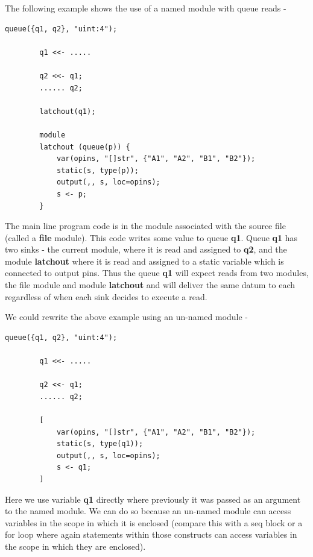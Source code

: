 \documentclass[10pt,a4paper,twoside,fleqn]{article}
\newcommand{\kwd}[1]{{\bf #1}} %
\newcommand{\var}[1]{{\bf #1}} %
\begin{document}
    The following example shows the use of a named module with queue reads -
    \begin{lstlisting}[language=threepl]
        queue({q1, q2}, "uint:4");
        
        q1 <<- .....

        q2 <<- q1;
        ...... q2;

        latchout(q1);

        module
        latchout (queue(p)) {
            var(opins, "[]str", {"A1", "A2", "B1", "B2"});
            static(s, type(p));
            output(,, s, loc=opins);
            s <- p;
        }
    \end{lstlisting}
    The main line program code is in the module associated with the source file
    (called a \kwd{file} module).
    This code writes some value to queue \var{q1}. Queue \var{q1} has two
    sinks - the current module, where it is read and assigned to \var{q2},
    and the module \var{latchout} where it is read and assigned to a static
    variable which is connected to output pins. Thus the queue \var{q1} will
    expect reads from two modules, the file module and module \var{latchout}
    and will deliver the same datum to each regardless of when each sink
    decides to execute a read.
    
    We could rewrite the above example using an un-named module -
    \begin{lstlisting}[language=threepl]
        queue({q1, q2}, "uint:4");
        
        q1 <<- .....

        q2 <<- q1;
        ...... q2;

        [
            var(opins, "[]str", {"A1", "A2", "B1", "B2"});
            static(s, type(q1));
            output(,, s, loc=opins);
            s <- q1;
        ]
    \end{lstlisting}
    Here we use variable \var{q1} directly where previously it was passed as
    an argument to the named module. We can do so because an un-named
    module can access variables in the scope in which it is enclosed (compare
    this with a seq block or a for loop where again statements within those
    constructs can access variables in the scope in which they are enclosed).
\end{document}
